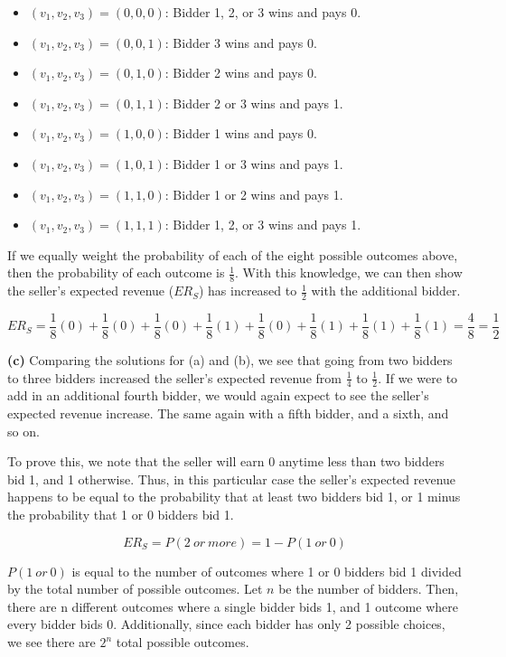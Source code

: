 \documentclass[twoside]{article}
\begin{document}
\begin{itemize}
  \item $(v_{1}, v_{2}, v_{3}) = (0, 0, 0)$: Bidder 1, 2, or 3 wins and pays 0.
  \item $(v_{1}, v_{2}, v_{3}) = (0, 0, 1)$: Bidder 3 wins and pays 0.
  \item $(v_{1}, v_{2}, v_{3}) = (0, 1, 0)$: Bidder 2 wins and pays 0.
  \item $(v_{1}, v_{2}, v_{3}) = (0, 1, 1)$: Bidder 2 or 3 wins and pays 1.
  \item $(v_{1}, v_{2}, v_{3}) = (1, 0, 0)$: Bidder 1 wins and pays 0.
  \item $(v_{1}, v_{2}, v_{3}) = (1, 0, 1)$: Bidder 1 or 3 wins and pays 1.
  \item $(v_{1}, v_{2}, v_{3}) = (1, 1, 0)$: Bidder 1 or 2 wins and pays 1.
  \item $(v_{1}, v_{2}, v_{3}) = (1, 1, 1)$: Bidder 1, 2, or 3 wins and pays 1.
\end{itemize}

If we equally weight the probability of each of the eight possible outcomes above, then the probability of each outcome is $\frac{1}{8}$. With this knowledge, we can then show the seller's expected revenue ($ER_{S}$) has increased to $\frac{1}{2}$ with the additional bidder.

$$ER_{S} = \frac{1}{8}(0) + \frac{1}{8}(0) + \frac{1}{8}(0) + \frac{1}{8}(1) + \frac{1}{8}(0) + \frac{1}{8}(1) + \frac{1}{8}(1) + \frac{1}{8}(1) = \frac{4}{8} = \frac{1}{2}$$

\vspace{10mm}
{\bf(c)} Comparing the solutions for (a) and (b), we see that going from two bidders to three bidders increased the seller's expected revenue from $\frac{1}{4}$ to $\frac{1}{2}$. If we were to add in an additional fourth bidder, we would again expect to see the seller's expected revenue increase. The same again with a fifth bidder, and a sixth, and so on.

To prove this, we note that the seller will earn 0 anytime less than two bidders bid 1, and 1 otherwise. Thus, in this particular case the seller's expected revenue happens to be equal to the probability that at least two bidders bid 1, or 1 minus the probability that 1 or 0 bidders bid 1.

$$ER_{S} = P(2\>or\>more) = 1 - P(1\>or\>0)$$

$P(1\>or\>0)$ is equal to the number of outcomes where 1 or 0 bidders bid 1 divided by the total number of possible outcomes. Let $n$ be the number of bidders. Then, there are n different outcomes where a single bidder bids 1, and 1 outcome where every bidder bids 0. Additionally, since each bidder has only 2 possible choices, we see there are $2^n$ total possible outcomes.
\end{document}

